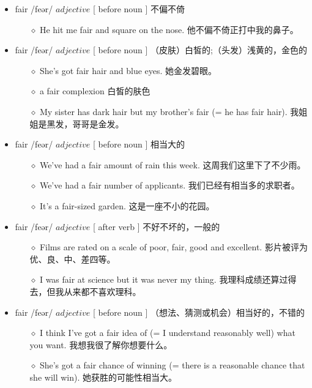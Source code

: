 \documentclass[a4paper,top=2.5cm,buttom=2.5cm10.5pt]{book}
\begin{document}
\begin{itemize}
\item fair /feər/ $ adjective $ [ before noun ] 不偏不倚
\begin{itemize}
\item[$\diamond$] He hit me fair and square on the nose.
他不偏不倚正打中我的鼻子。
\end{itemize}
\end{itemize}
\begin{itemize}
\item fair /feər/ $ adjective $ [ before noun ] （皮肤）白皙的;（头发）浅黄的，金色的
\begin{itemize}
\item[$\diamond$] She's got fair hair and blue eyes.
她金发碧眼。
\item[$\diamond$] a fair complexion
白皙的肤色
\item[$\diamond$] My sister has dark hair but my brother's fair (= he has fair hair).
我姐姐是黑发，哥哥是金发。
\end{itemize}
\end{itemize}
\begin{itemize}
\item fair /feər/ $ adjective $ [ before noun ] 相当大的
\begin{itemize}
\item[$\diamond$] We've had a fair amount of rain this week.
这周我们这里下了不少雨。
\item[$\diamond$] We've had a fair number of applicants.
我们已经有相当多的求职者。
\item[$\diamond$] It's a fair-sized garden.
这是一座不小的花园。
\end{itemize}
\end{itemize}
\begin{itemize}
\item fair /feər/ $ adjective $ [ after verb ] 不好不坏的，一般的
\begin{itemize}
\item[$\diamond$] Films are rated on a scale of poor, fair, good and excellent.
影片被评为优、良、中、差四等。
\item[$\diamond$] I was fair at science but it was never my thing.
我理科成绩还算过得去，但我从来都不喜欢理科。
\end{itemize}
\end{itemize}
\begin{itemize}
\item fair /feər/ $ adjective $ [ before noun ] （想法、猜测或机会）相当好的，不错的
\begin{itemize}
\item[$\diamond$] I think I've got a fair idea of (= I understand reasonably well) what you want.
我想我很了解你想要什么。
\item[$\diamond$] She's got a fair chance of winning (= there is a reasonable chance that she will win).
她获胜的可能性相当大。
\end{itemize}
\end{itemize}
\end{document}
